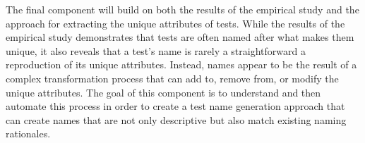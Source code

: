 The final component will build on both the results of the empirical study and the approach for extracting the unique attributes of tests.
%
While the results of the empirical study demonstrates that tests are often named after what makes them unique, it also reveals that a test's name is rarely a straightforward a reproduction of its unique attributes.
%
Instead, names appear to be the result of a complex transformation process that can add to, remove from, or modify the unique attributes.
%
The goal of this component is to understand and then automate this process in order to create a test name generation approach that can create names that are not only descriptive but also match existing naming rationales.


